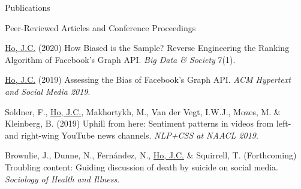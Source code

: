 \documentclass{resume} %
\begin{document}
\begin{rSection}{Publications}

\begin{rSubsectionPublication}{Peer-Reviewed Articles and Conference Proceedings}
\item \underline{Ho, J.C.} (2020) How Biased is the Sample? Reverse Engineering the Ranking Algorithm of Facebook's Graph API. \textit{Big Data \& Society} 7(1).
\item \underline{Ho, J.C.} (2019) Assessing the Bias of Facebook's Graph API. \textit{ACM Hypertext and Social Media 2019}. 
\item Soldner, F., \underline{Ho, J.C.}, Makhortykh, M., Van der Vegt, I.W.J., Mozes, M. \& Kleinberg, B. (2019) Uphill from here: Sentiment patterns in videos from left- and right-wing YouTube news channels. \textit{NLP+CSS at NAACL 2019}.
\item Brownlie, J., Dunne, N., Fernández, N., \underline{Ho, J.C.} \& Squirrell, T. (Forthcoming) Troubling content: Guiding discussion of death by suicide on social media. \textit{Sociology of Health and Illness}.
\end{rSubsectionPublication}


\end{rSection}
\end{document}
